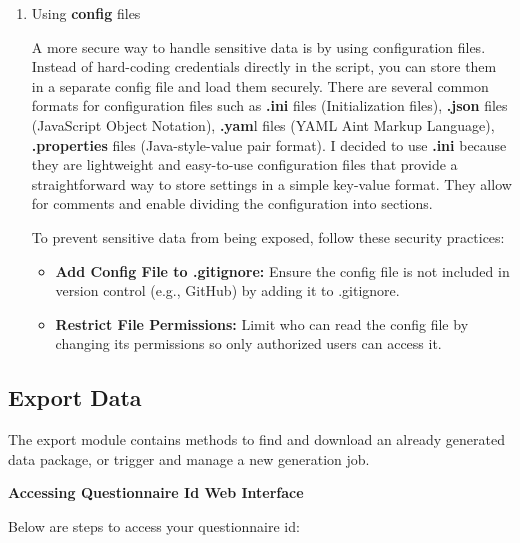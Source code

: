 \documentclass[
  letterpaper,
  DIV=11,
  numbers=noendperiod]{scrreprt}
\providecommand{\tightlist}{%
  \setlength{\itemsep}{0pt}\setlength{\parskip}{0pt}}\usepackage{longtable,booktabs,array}
\begin{document}
\begin{enumerate}
\def\labelenumi{\arabic{enumi}.}
\setcounter{enumi}{1}
\item
  Using \textbf{config} files

  A more secure way to handle sensitive data is by using configuration
  files. Instead of hard-coding credentials directly in the script, you
  can store them in a separate config file and load them securely. There
  are several common formats for configuration files such as
  \textbf{.ini} files (Initialization files), \textbf{.json} files
  (JavaScript Object Notation), \textbf{.yam}l files (YAML Aint Markup
  Language), \textbf{.properties} files (Java-style-value pair format).
  I decided to use \textbf{.ini} because they are lightweight and
  easy-to-use configuration files that provide a straightforward way to
  store settings in a simple key-value format. They allow for comments
  and enable dividing the configuration into sections.

  To prevent sensitive data from being exposed, follow these security
  practices:

  \begin{itemize}
  \tightlist
  \item
    \textbf{Add Config File to .gitignore:} Ensure the config file is
    not included in version control (e.g., GitHub) by adding it to
    .gitignore.
  \item
    \textbf{Restrict File Permissions:} Limit who can read the config
    file by changing its permissions so only authorized users can access
    it.
  \end{itemize}
\end{enumerate}

\subsection{Export Data}\label{export-data}

The export module contains methods to find and download an already
generated data package, or trigger and manage a new generation job.

\textbf{Accessing Questionnaire Id Web Interface}

Below are steps to access your questionnaire id:
\end{document}
